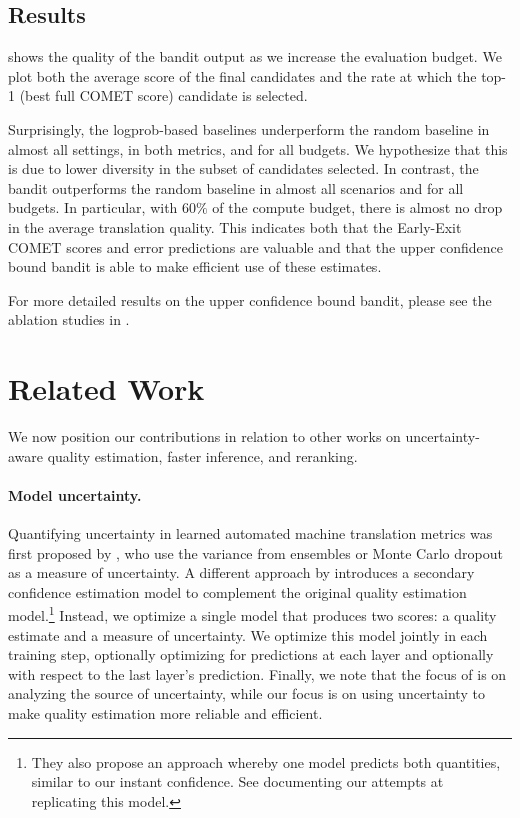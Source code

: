 \subsection{Results}

 shows the quality of the bandit output as we increase the evaluation budget.
We plot both the average score of the final candidates and the rate at which the top-1 (best full COMET score) candidate is selected. 

Surprisingly, the logprob-based baselines underperform the random baseline 
in almost all settings, in both metrics, and for all budgets.
We hypothesize that this is due to lower diversity in the subset of candidates selected. 
In contrast, the bandit outperforms the random baseline in almost all scenarios and for all budgets. In particular, with $60\%$ of the compute budget, there is almost no drop in the average translation quality.
This indicates both that the Early-Exit COMET scores and error predictions are valuable and that the upper confidence bound bandit is able to make efficient use of these estimates.

For more detailed results on the upper confidence bound bandit, please see the ablation studies in .

\section{Related Work}

We now position our contributions in relation to other works on uncertainty-aware quality estimation, faster inference, and reranking.


\paragraph{Model uncertainty.}
Quantifying uncertainty in learned automated machine translation metrics was first proposed by \citet{glushkova-etal-2021-uncertainty-aware}, who use the variance from ensembles or Monte Carlo dropout as a measure of uncertainty.
A different approach by \citet{zerva-etal-2022-disentangling} introduces a secondary confidence estimation model to complement the original quality estimation model.\footnote{
They also propose an approach whereby one model predicts both quantities, similar to our instant confidence.
See  documenting our attempts at replicating this model.
}
Instead, we optimize a single model that produces two scores: a quality estimate and a measure of uncertainty.
We optimize this model jointly in each training step, optionally optimizing for predictions at each layer and optionally with respect to the last layer's prediction.
Finally, we note that the focus of \citet{zerva-etal-2022-disentangling} is on analyzing the source of uncertainty, while our focus is on using uncertainty to make quality estimation more reliable and efficient.

